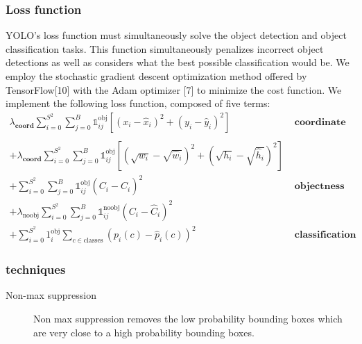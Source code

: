 \documentclass[a4paper]{article}
\begin{document}
\subsubsection*{Loss function}
YOLO’s loss function must simultaneously solve the object detection and object classification tasks. This function
simultaneously penalizes incorrect object detections
as well as considers what the best possible classification
would be. We employ the stochastic gradient descent
optimization method offered by TensorFlow[10] with the
Adam optimizer [7] to minimize the cost function. We
implement the following loss function, composed of five
terms:
\begin{align*}
\lambda_\textbf{coord}
\sum_{i = 0}^{S^2}
    \sum_{j = 0}^{B}
     {\mathbb{1}}_{ij}^{\text{obj}}
            \left[
            \left(
                x_i - \hat{x}_i
            \right)^2 +
            \left(
                y_i - \hat{y}_i
            \right)^2
            \right]&\textbf{\ coordinate loss}
\\\\
+ \lambda_\textbf{coord} 
\sum_{i = 0}^{S^2}
    \sum_{j = 0}^{B}
         {\mathbb{1}}_{ij}^{\text{obj}}
         \left[
        \left(
            \sqrt{w_i} - \sqrt{\hat{w}_i}
        \right)^2 +
        \left(
            \sqrt{h_i} - \sqrt{\hat{h}_i}
        \right)^2
        \right]\\
+ \sum_{i = 0}^{S^2}
    \sum_{j = 0}^{B}
        {\mathbb{1}}_{ij}^{\text{obj}}
        \left(
            C_i - \hat{C}_i
        \right)^2&\textbf{\ objectness loss}
\\
+ \lambda_\textrm{noobj}
\sum_{i = 0}^{S^2}
    \sum_{j = 0}^{B}
    {\mathbb{1}}_{ij}^{\text{noobj}}
        \left(
            C_i - \hat{C}_i
        \right)^2\\ 
+ \sum_{i = 0}^{S^2}
{{1}}_i^{\text{obj}}
    \sum_{c \in \textrm{classes}}
        \left(
            p_i(c) - \hat{p}_i(c)
        \right)^2&\textbf{\ classification loss}
\end{align*}


\subsubsection*{techniques}
\begin{description}
\item[Non-max suppression] Non max suppression removes the low probability bounding boxes which are very close to a high probability bounding boxes.
\end{description}
\end{document}
